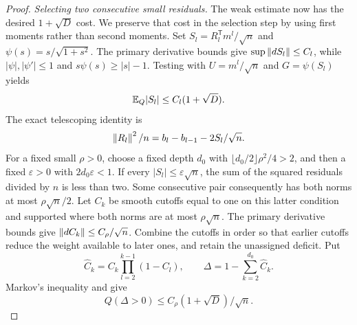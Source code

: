 \begin{proof}
\emph{Selecting two consecutive small residuals.}
The weak estimate now has the desired $1+\sqrt D$ cost.  We preserve that
cost in the selection step by using first moments rather than second
moments.  Set $S_l=R_l^{\mathsf T}m^l/\sqrt n$ and
$\psi(s)=s/\sqrt{1+s^2}$.  The primary derivative bounds give
$\sup\left\lVert dS_l\right\rVert\le C_l$, while $|\psi|,|\psi'|\le1$ and
$s\psi(s)\ge|s|-1$.  Testing  with
$U=m^l/\sqrt n$ and $G=\psi(S_l)$ yields
\begin{equation}\label{eq:stat-S-first-moment}
 \mathbb E_Q|S_l|\le C_l(1+\sqrt D).
\end{equation}
The exact telescoping identity is
\[
 \left\lVert R_l\right\rVert^2/n=b_l-b_{l-1}-2S_l/\sqrt n.
\]
For a fixed small $\rho>0$, choose a fixed depth $d_0$ with
$\lfloor d_0/2\rfloor\rho^2/4>2$, and then a fixed $\varepsilon>0$
with $2d_0\varepsilon<1$.  If every $|S_l|\le\varepsilon\sqrt n$,
the sum of the squared residuals divided by $n$ is less than two.
Some consecutive pair consequently has both norms at most
$\rho\sqrt n/2$.  Let $C_k$ be smooth cutoffs equal to one on this latter
condition and supported where both norms are at most $\rho\sqrt n$.
The primary derivative bounds give $\left\lVert dC_k\right\rVert\le C_\rho/\sqrt n$.
Combine the cutoffs in order so that earlier cutoffs reduce the weight
available to later ones, and retain the unassigned deficit.  Put
\[
 \widehat C_k=C_k\prod_{l=2}^{k-1}(1-C_l),\qquad
 \Delta=1-\sum_{k=2}^{d_0}\widehat C_k.
\]
Markov's inequality and  give
\begin{equation}\label{eq:stat-selection}
 Q(\Delta>0)\le C_\rho(1+\sqrt D)/\sqrt n.
\end{equation}


\end{proof}
